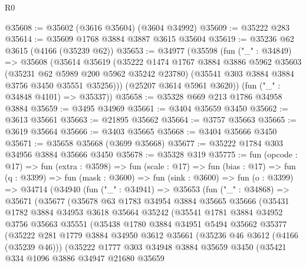 \begin{lexlean}{R0}
\begin{coremodule}
@35608 := @35602 (@3616 @35604) (@3604 @34992)
@35609 := @35222 @283
@35614 := @35609 @1768 @3884 @3887 @3615 @35604
@35619 := @35236 @62 @3615 (@4166 (@35239 @62))
@35653 := @34977
    (@35598
      (fun ("_" : @34849) =>
      @35608
        (@35614
          @35619
          (@35222
            @1474
            @1767
            @3884
            @3886
            @5962
            @35603
            (@35231 @62 @5989 @200 @5962 @35242 @23780)
            (@35541 @303 @3884 @3884 @3756 @3450 @35551 @35256)))
        (@25207 @3614 @5961 @3620))
      (fun ("_" : @34848 @4101) => @35337))
@35658 := @35328 @669 @213 @1786 @34958 @3884
@35659 := @3495 @34969
@35661 := @3404 @35659 @3450
@35662 := @3613 @35661
@35663 := @21895 @35662
@35664 := @3757 @35663
@35665 := @3619 @35664
@35666 := @3403 @35665
@35668 := @3404 @35666 @3450
@35671 := @35658 @35668 (@3699 @35668)
@35677 := @35222 @1784 @303 @34956 @3884 @35666 @3450
@35678 := @35328 @319
@35775 := fun (opcode : @17) =>
  fun (extra : @3598) =>
  fun (scale : @17) =>
  fun (bias : @17) =>
  fun (q : @3399) =>
  fun (mask : @3600) =>
  fun (sink : @3600) =>
  fun (o : @3399) =>
  @34714
    (@34940
      (fun ("_" : @34941) =>
      @35653
        (fun ("_" : @34868) =>
        @35671
          (@35677
            (@35678
              @63
              @1783
              @34954
              @3884
              @35665
              @35666
              (@35431
                @1782
                @3884
                @34953
                @3618
                @35664
                @35242
                (@35541
                  @1781
                  @3884
                  @34952
                  @3756
                  @35663
                  @35551
                  (@35438
                    @1780
                    @3884
                    @34951
                    @5494
                    @35662
                    @35377
                    (@35222
                      @281
                      @1779
                      @3884
                      @34950
                      @3612
                      @35661
                      (@35236 @46 @3612 (@4166 (@35239 @46)))
                      (@35222
                        @1777
                        @303
                        @34948
                        @3884
                        @35659
                        @3450
                        (@35421
                          @334
                          @1096
                          @3886
                          @34947
                          @21680
                          @35659

\end{coremodule}
\end{lexlean}
